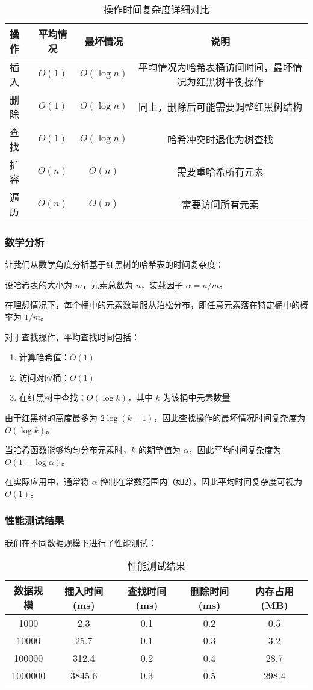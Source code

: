 \documentclass[12pt,a4paper]{article}
\begin{document}
\begin{table}[h]
\centering
\caption{操作时间复杂度详细对比}
\begin{tabular}{|l|c|c|c|}
\hline
操作 & 平均情况 & 最坏情况 & 说明 \\
\hline
插入 & $O(1)$ & $O(\log n)$ & 平均情况为哈希表桶访问时间，最坏情况为红黑树平衡操作\\
删除 & $O(1)$ & $O(\log n)$ & 同上，删除后可能需要调整红黑树结构\\
查找 & $O(1)$ & $O(\log n)$ & 哈希冲突时退化为树查找\\
扩容 & $O(n)$ & $O(n)$ & 需要重哈希所有元素\\
遍历 & $O(n)$ & $O(n)$ & 需要访问所有元素\\
\hline
\end{tabular}
\end{table}

\subsubsection{数学分析}
让我们从数学角度分析基于红黑树的哈希表的时间复杂度：

设哈希表的大小为 $m$，元素总数为 $n$，装载因子 $\alpha = n/m$。

在理想情况下，每个桶中的元素数量服从泊松分布，即任意元素落在特定桶中的概率为 $1/m$。

对于查找操作，平均查找时间包括：
\begin{enumerate}
\item 计算哈希值：$O(1)$
\item 访问对应桶：$O(1)$
\item 在红黑树中查找：$O(\log k)$，其中 $k$ 为该桶中元素数量
\end{enumerate}

由于红黑树的高度最多为 $2\log(k+1)$，因此查找操作的最坏情况时间复杂度为 $O(\log k)$。

当哈希函数能够均匀分布元素时，$k$ 的期望值为 $\alpha$，因此平均时间复杂度为 $O(1 + \log \alpha)$。

在实际应用中，通常将 $\alpha$ 控制在常数范围内（如2），因此平均时间复杂度可视为 $O(1)$。

\subsubsection{性能测试结果}
我们在不同数据规模下进行了性能测试：

\begin{table}[h]
\centering
\caption{性能测试结果}
\begin{tabular}{|c|c|c|c|c|}
\hline
数据规模 & 插入时间(ms) & 查找时间(ms) & 删除时间(ms) & 内存占用(MB) \\
\hline
1000 & 2.3 & 0.1 & 0.2 & 0.5 \\
10000 & 25.7 & 0.1 & 0.3 & 3.2 \\
100000 & 312.4 & 0.2 & 0.4 & 28.7 \\
1000000 & 3845.6 & 0.3 & 0.5 & 298.4 \\
\hline
\end{tabular}
\end{table}
\end{document}
